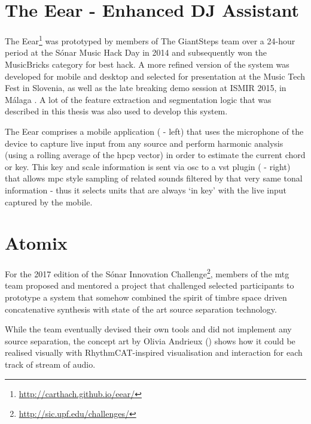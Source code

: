 \section{The Eear - Enhanced DJ Assistant}

The Eear\footnote{\url{http://carthach.github.io/eear/}} was prototyped by members of The GiantSteps team over a 24-hour period at the Sónar Music Hack Day in 2014 and subsequently won the MusicBricks category for best hack. A more refined version of the system was developed for mobile and desktop and selected for presentation at the Music Tech Fest in Slovenia, as well as the late breaking demo session at ISMIR 2015, in Málaga \citep{ONuanain2015}. A lot of the feature extraction and segmentation logic that was described in this thesis was also used to develop this system.

The Eear comprises a mobile application ( - left) that uses the microphone of the device to capture live input from any source and perform harmonic analysis (using a rolling average of the \acrshort{hpcp} vector) in order to estimate the current chord or key. This key and scale information is sent via \acrshort{osc} to a \acrshort{vst} plugin ( - right) that allows \acrshort{mpc} style sampling of related sounds filtered by that very same tonal information - thus it selects units that are always `in key' with the live input captured by the mobile.

\section{Atomix}

For the 2017 edition of the Sónar Innovation Challenge\footnote{\url{http://sic.upf.edu/challenges/}}, members of the \acrshort{mtg} team proposed and mentored a project that challenged selected participants to prototype a system that somehow combined the spirit of timbre space driven concatenative synthesis with state of the art source separation technology.

While the team eventually devised their own tools and did not implement any source separation, the concept art by Olivia Andrieux () shows how it could be realised visually with RhythmCAT-inspired visualisation and interaction for each track of stream of audio.

